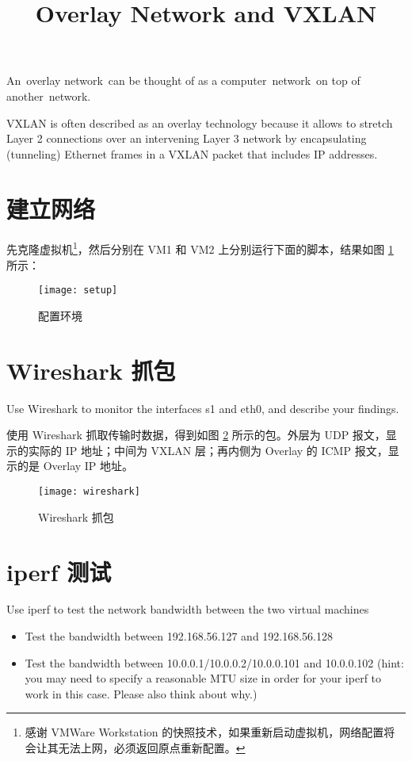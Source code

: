 \endofdump
{}

    \title{Overlay Network and VXLAN}
    \maketitle
    \tableofcontents
    \vfill
    An overlay network can be thought of as a computer network on top of another network. 

    VXLAN is often described as an overlay technology because it allows to stretch Layer 2 connections over an intervening Layer 3 network by encapsulating (tunneling) Ethernet frames in a VXLAN packet that includes IP addresses.
    \vfill
    \clearpage
    \section{建立网络}

    先克隆虚拟机\footnote{感谢 VMWare Workstation 的快照技术，如果重新启动虚拟机，网络配置将会让其无法上网，必须返回原点重新配置。}，然后分别在 VM1 和 VM2 上分别运行下面的脚本，结果如图 \ref{fig:setup} 所示：


    \begin{figure}[H]
        \centering
        \texttt{[image: setup]}
        \caption{配置环境}\label{fig:setup}
    \end{figure}

    \section{Wireshark 抓包}
    Use Wireshark to monitor the interfaces s1 and eth0, and describe your findings.

    使用 Wireshark 抓取传输时数据，得到如图 \ref{fig:wireshark} 所示的包。外层为 UDP 报文，显示的实际的 IP 地址；中间为 VXLAN 层；再内侧为 Overlay 的 ICMP 报文，显示的是 Overlay IP 地址。

    \begin{figure}[H]
        \centering
        \texttt{[image: wireshark]}
        \caption{Wireshark 抓包}\label{fig:wireshark}
    \end{figure}

    \section{iperf 测试}
    Use iperf to test the network bandwidth between the two virtual machines 
    \begin{itemize}
        \item Test the bandwidth between 192.168.56.127 and 192.168.56.128
        \item Test the bandwidth between 10.0.0.1/10.0.0.2/10.0.0.101 and 10.0.0.102 (hint: you may need to specify a reasonable MTU size in order for your iperf to work in this case. Please also think about why.)
    \end{itemize}

